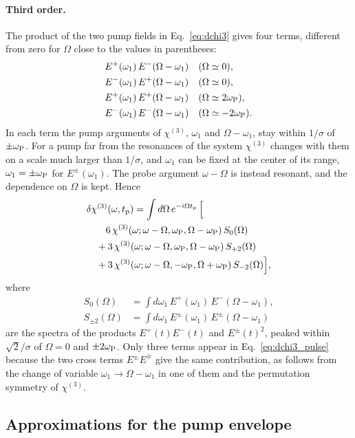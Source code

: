 \documentclass[aps,prb,reprint,superscriptaddress,amsmath,amssymb]{revtex4-2}
\begin{document}
\paragraph{Third order.} The product of the two pump fields in Eq.~\eqref{eq:dchi3} gives four terms, different
from zero for $\Omega$ close to the values in parentheses:
\begin{align*}
&E^+(\omega_1)\,E^-(\Omega-\omega_1) &&(\Omega\simeq0) , \\
&E^-(\omega_1)\,E^+(\Omega-\omega_1) &&(\Omega\simeq0) , \\
&E^+(\omega_1)\,E^+(\Omega-\omega_1) &&(\Omega\simeq2\omega_{\mathrm{P}}) , \\
&E^-(\omega_1)\,E^-(\Omega-\omega_1) &&(\Omega\simeq-2\omega_{\mathrm{P}}) .
\end{align*}
In each term the pump arguments of $\chi^{(3)}$, $\omega_1$ and $\Omega-\omega_1$, stay within $1/\sigma$ of $\pm\omega_{\mathrm{P}}$. For a pump far from the resonances of the system $\chi^{(3)}$
changes with them on a scale much larger than $1/\sigma$, and $\omega_1$ can be fixed at the center of its range,
$\omega_1 = \pm\omega_{\mathrm{P}}$ for $E^\pm(\omega_1)$. The probe argument $\omega-\Omega$ is instead resonant, and the dependence
on $\Omega$ is kept. Hence
\begin{align}
&\delta\chi^{(3)}(\omega,t_{\mathrm{p}}) = \int d\Omega\,e^{-i\Omega t_{\mathrm{p}}}\,\Big[ \nonumber\\
&\qquad 6\,\chi^{(3)}(\omega;\omega-\Omega,\omega_{\mathrm{P}},\Omega-\omega_{\mathrm{P}})\,S_0(\Omega) \nonumber\\
&\quad + 3\,\chi^{(3)}(\omega;\omega-\Omega,\omega_{\mathrm{P}},\Omega-\omega_{\mathrm{P}})\,S_{+2}(\Omega) \nonumber\\
&\quad + 3\,\chi^{(3)}(\omega;\omega-\Omega,-\omega_{\mathrm{P}},\Omega+\omega_{\mathrm{P}})\,S_{-2}(\Omega)\Big] ,
\label{eq:dchi3_pulse}
\end{align}
where
\begin{align}
S_0(\Omega) &= \int d\omega_1\,E^+(\omega_1)\,E^-(\Omega-\omega_1) , \nonumber\\
S_{\pm2}(\Omega) &= \int d\omega_1\,E^\pm(\omega_1)\,E^\pm(\Omega-\omega_1)
\label{eq:S}
\end{align}
are the spectra of the products $E^+(t)E^-(t)$ and $E^\pm(t)^2$, peaked within $\sqrt{2}/\sigma$ of $\Omega = 0$ and
$\pm2\omega_{\mathrm{P}}$. Only three terms appear in Eq.~\eqref{eq:dchi3_pulse} because the two cross
terms $E^{\pm}E^{\mp}$ give the same contribution, as follows from the change of variable $\omega_1\to\Omega-\omega_1$ in one of them
and the permutation symmetry of $\chi^{(3)}$.

\subsection{Approximations for the pump envelope}
\label{sec:theory_envelope}
\end{document}
